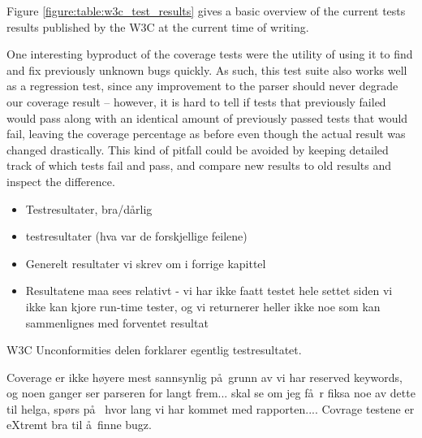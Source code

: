Figure \ref{figure:table:w3c_test_results} gives a basic overview of the current
tests results published by the W3C at the current time of writing.

One interesting byproduct of the coverage tests were the utility of using it to
find and fix previously unknown bugs quickly. As such, this test suite also
works well as a regression test, since any improvement to the parser should
never degrade our coverage result -- however, it is hard to tell if tests that
previously failed would pass along with an identical amount of previously
passed tests that would fail, leaving the coverage percentage as before even
though the actual result was changed drastically. This kind of pitfall could be
avoided by keeping detailed track of which tests fail and pass, and compare new
results to old results and inspect the difference.


\begin{itemize}
\item Testresultater, bra/d\aa rlig
\item testresultater (hva var de forskjellige feilene)
\item Generelt resultater vi skrev om i forrige kapittel
\item Resultatene maa sees relativt - vi har ikke faatt testet hele settet siden
vi ikke kan kjore run-time tester, og vi returnerer heller ikke noe som kan
sammenlignes med forventet resultat
\end{itemize}

W3C Unconformities delen forklarer egentlig testresultatet.

Coverage er ikke h\o yere mest sannsynlig p\aa~grunn av vi har reserved
keywords, og noen ganger ser parseren for langt frem... skal se om jeg f\aa~r
fiksa noe av dette til helga, sp\o rs p\aa~ hvor lang vi har kommet med
rapporten.... Covrage testene er eXtremt bra til \aa~finne bugz.